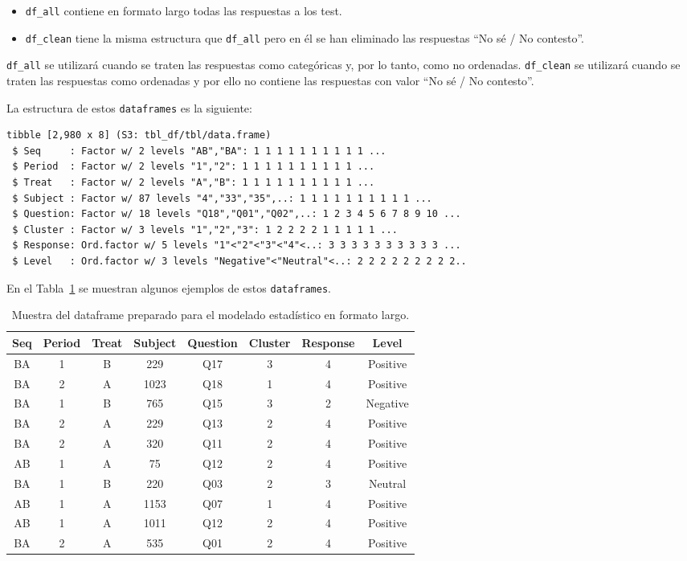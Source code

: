\documentclass[
  12pt,
  a4paper,
  extrafontsizes,
  onecolumn,
  openright]{memoir}
\providecommand{\tightlist}{%
  \setlength{\itemsep}{0pt}\setlength{\parskip}{0pt}}\usepackage{longtable,booktabs,array}
\begin{document}
\begin{itemize}
\tightlist
\item
  \texttt{df\_all} contiene en formato largo todas las respuestas a los
  test.
\item
  \texttt{df\_clean} tiene la misma estructura que \texttt{df\_all} pero
  en él se han eliminado las respuestas \enquote{No sé / No contesto}.
\end{itemize}

\texttt{df\_all} se utilizará cuando se traten las respuestas como
categóricas y, por lo tanto, como no ordenadas. \texttt{df\_clean} se
utilizará cuando se traten las respuestas como ordenadas y por ello no
contiene las respuestas con valor \enquote{No sé / No contesto}.

La estructura de estos \texttt{dataframes} es la siguiente:

\begin{verbatim}
tibble [2,980 x 8] (S3: tbl_df/tbl/data.frame)
 $ Seq     : Factor w/ 2 levels "AB","BA": 1 1 1 1 1 1 1 1 1 1 ...
 $ Period  : Factor w/ 2 levels "1","2": 1 1 1 1 1 1 1 1 1 1 ...
 $ Treat   : Factor w/ 2 levels "A","B": 1 1 1 1 1 1 1 1 1 1 ...
 $ Subject : Factor w/ 87 levels "4","33","35",..: 1 1 1 1 1 1 1 1 1 1 ...
 $ Question: Factor w/ 18 levels "Q18","Q01","Q02",..: 1 2 3 4 5 6 7 8 9 10 ...
 $ Cluster : Factor w/ 3 levels "1","2","3": 1 2 2 2 2 1 1 1 1 1 ...
 $ Response: Ord.factor w/ 5 levels "1"<"2"<"3"<"4"<..: 3 3 3 3 3 3 3 3 3 3 ...
 $ Level   : Ord.factor w/ 3 levels "Negative"<"Neutral"<..: 2 2 2 2 2 2 2 2 2..
\end{verbatim}

En el Tabla~\ref{tbl-df_clean} se muestran algunos ejemplos de estos
\texttt{dataframes}.

\hypertarget{tbl-df_clean}{}
\begin{longtable}{cccccccc}
\caption{\label{tbl-df_clean}Muestra del dataframe preparado para el modelado estadístico en formato
largo. }\tabularnewline

\toprule
Seq & Period & Treat & Subject & Question & Cluster & Response & Level \\ 
\midrule
BA & 1 & B & 229 & Q17 & 3 & 4 & Positive \\ 
BA & 2 & A & 1023 & Q18 & 1 & 4 & Positive \\ 
BA & 1 & B & 765 & Q15 & 3 & 2 & Negative \\ 
BA & 2 & A & 229 & Q13 & 2 & 4 & Positive \\ 
BA & 2 & A & 320 & Q11 & 2 & 4 & Positive \\ 
AB & 1 & A & 75 & Q12 & 2 & 4 & Positive \\ 
BA & 1 & B & 220 & Q03 & 2 & 3 & Neutral \\ 
AB & 1 & A & 1153 & Q07 & 1 & 4 & Positive \\ 
AB & 1 & A & 1011 & Q12 & 2 & 4 & Positive \\ 
BA & 2 & A & 535 & Q01 & 2 & 4 & Positive \\ 
\bottomrule
\end{longtable}
\end{document}
